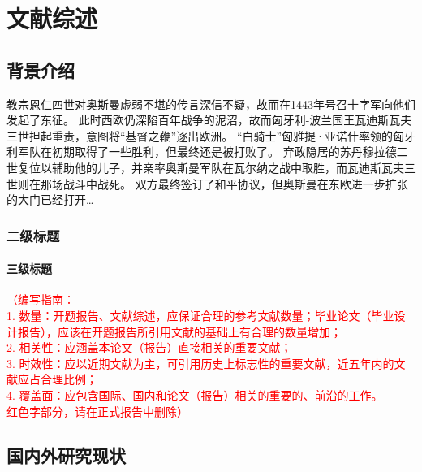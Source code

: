 \cleardoublepage


\section{文献综述}

\subsection{背景介绍}

\par 教宗恩仁四世对奥斯曼虚弱不堪的传言深信不疑，故而在1443年号召十字军向他们发起了东征。
此时西欧仍深陷百年战争的泥沼，故而匈牙利-波兰国王瓦迪斯瓦夫三世担起重责，意图将“基督之鞭”逐出欧洲。
“白骑士”匈雅提·亚诺什率领的匈牙利军队在初期取得了一些胜利，但最终还是被打败了。
弃政隐居的苏丹穆拉德二世复位以辅助他的儿子，并亲率奥斯曼军队在瓦尔纳之战中取胜，而瓦迪斯瓦夫三世则在那场战斗中战死。
双方最终签订了和平协议，但奥斯曼在东欧进一步扩张的大门已经打开\dots {}

\subsubsection{二级标题}

\paragraph{三级标题}

\noindent\textcolor{red}{
（编写指南：\\
1. 数量：开题报告、文献综述，应保证合理的参考文献数量；毕业论文（毕业设计报告），应该在开题报告所引用文献的基础上有合理的数量增加；\\
2. 相关性：应涵盖本论文（报告）直接相关的重要文献；\\
3. 时效性：应以近期文献为主，可引用历史上标志性的重要文献，近五年内的文献应占合理比例；\\
4. 覆盖面：应包含国际、国内和论文（报告）相关的重要的、前沿的工作。\\
红色字部分，请在正式报告中删除）
}

\clearpage

\subsection{国内外研究现状}

